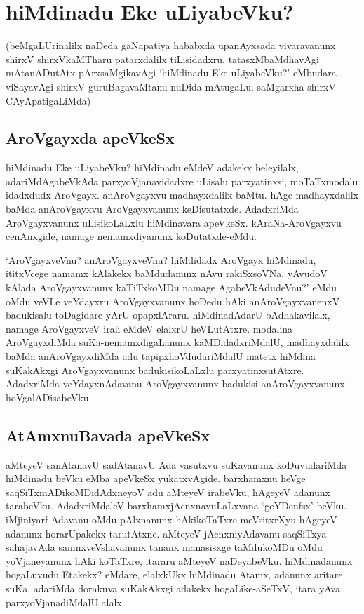 \chapter{hiMdinadu Eke uLiyabeVku?} 

(beMgaLUrinalilx naDeda gaNapatiya hababxda upanAyxsada vivaravanunx shirxV shirxVkaMTharu patarxdalilx tiLisidadxru. tatasxMbaMdhavAgi mAtanADutAtx pArxsaMgikavAgi `hiMdinadu Eke uLiyabeVku?' eMbudara viSayavAgi shirxV guruBagavaMtanu nuDida mAtugaLu. saMgarxha-shirxV CAyApatigaLiMda) 

\section*{AroVgayxda apeVkeSx}

hiMdinadu Eke uLiyabeVku? hiMdinadu eMdeV adakekx beleyilalx, adariMdAgabeVkAda parxyoVjanavidadxre uLisalu parxyatinxsi, moTaTxmodalu idadxdudx AroVgayx. anAroVgayxvu madhayxdalilx baMtu. hAge madhayxdalilx baMda anAroVgayxvu AroVgayxvanunx keDisutatxde. AdadxriMda AroVgayxvanunx uLisikoLaLxlu hiMdinavara apeVkeSx. kAraNa-AroVgayxvu cenAnxgide, namage nemamxdiyanunx koDutatxde-eMdu. 

`AroVgayxveVnu? anAroVgayxveVnu? hiMdidadx AroVgayx hiMdinadu, ititxVcege namamx kAlakekx baMdudanunx nAvu rakiSxsoVNa. yAvudoV kAlada AroVgayxvanunx kaTiTxkoMDu namage AgabeVkAdudeVnu?' eMdu oMdu veVLe veYdayxru AroVgayxvanunx hoDedu hAki anAroVgayxvanenxV badukisalu toDagidare yArU opapxlAraru. hiMdinadAdarU bAdhakavilalx, namage AroVgayxveV irali eMdeV elalxrU heVLutAtxre. modalina AroVgayxdiMda suKa-nemamxdigaLanunx kaMDidadxriMdalU, madhayxdalilx baMda anAroVgayxdiMda adu tapipxhoVdudariMdalU matetx hiMdina suKakAkxgi AroVgayxvanunx badukisikoLaLxlu parxyatinxsutAtxre. AdadxriMda veYdayxnAdavanu AroVgayxvanunx badukisi anAroVgayxvanunx hoVgalADisabeVku. 

\section*{AtAmxnuBavada apeVkeSx}

aMteyeV sanAtanavU sadAtanavU Ada vasutxvu suKavanunx koDuvudariMda hiMdinadu beVku eMba apeVkeSx yukatxvAgide. barxhamxnu heVge saqSiTxmADikoMDidAdxneyoV adu aMteyeV irabeVku, hAgeyeV adanunx tarabeVku. AdadxriMdaleV barxhamxjAcnxnavuLaLxvana `geYDenfsx' beVku. iMjiniyarf Adavanu oMdu pAlxnanunx hAkikoTaTxre meVsitxrXyu hAgeyeV adanunx horarUpakekx tarutAtxne. aMteyeV jAcnxniyAdavanu saqSiTxya sahajavAda saninxveVshavanunx tananx manasisxge taMdukoMDu oMdu yoVjaneyanunx hAki koTaTxre, itararu aMteyeV naDeyabeVku. hiMdinadanunx hogaLuvudu Etakekx? eMdare, elalxkUkx hiMdinadu Atamx, adanunx aritare suKa, adariMda dorakuva suKakAkxgi adakekx hogaLike-aSeTxV, itara yAva parxyoVjanadiMdalU alalx. 

